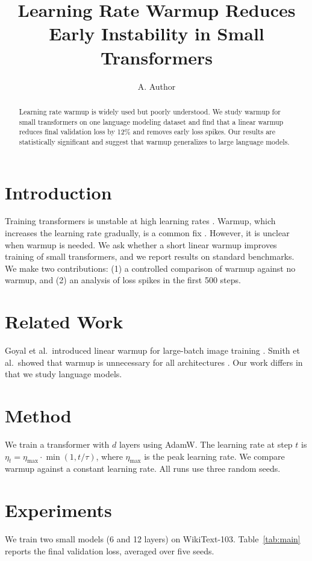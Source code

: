 \documentclass{article}
\begin{document}
\title{Learning Rate Warmup Reduces Early Instability in Small Transformers}
\author{A. Author}
\maketitle

\begin{abstract}
Learning rate warmup is widely used but poorly understood. We study warmup for small transformers on one language modeling dataset and find that a linear warmup reduces final validation loss by 12\% and removes early loss spikes. Our results are statistically significant and suggest that warmup generalizes to large language models.
\end{abstract}

\section{Introduction}
Training transformers is unstable at high learning rates \cite{vaswani2017}. Warmup, which increases the learning rate gradually, is a common fix \cite{goyal2017}. However, it is unclear when warmup is needed. We ask whether a short linear warmup improves training of small transformers, and we report results on standard benchmarks. We make two contributions: (1) a controlled comparison of warmup against no warmup, and (2) an analysis of loss spikes in the first 500 steps.

\section{Related Work}
Goyal et al.\ introduced linear warmup for large-batch image training \cite{goyal2017}. Smith et al.\ showed that warmup is unnecessary for all architectures \cite{smith2019}. Our work differs in that we study language models.

\section{Method}
We train a transformer with $d$ layers using AdamW. The learning rate at step $t$ is $\eta_t = \eta_{\max} \cdot \min(1, t/\tau)$, where $\eta_{\max}$ is the peak learning rate. We compare warmup against a constant learning rate. All runs use three random seeds.

\section{Experiments}
We train two small models (6 and 12 layers) on WikiText-103. Table~\ref{tab:main} reports the final validation loss, averaged over five seeds.
\end{document}
